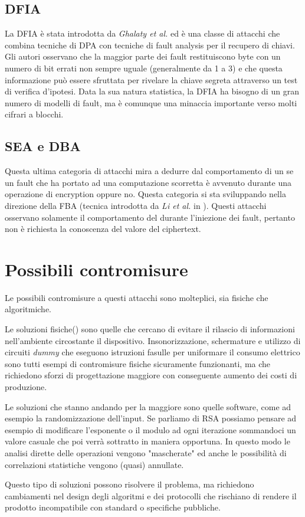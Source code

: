 		\subsection*{\ac{DFIA}}
			La \ac{DFIA} è stata introdotta da \emph{Ghalaty et al.}\cite{ghalaty2014differential} ed è una classe di attacchi che combina tecniche di \ac{DPA} con tecniche di fault analysis per il recupero di chiavi\cite{fuhr2013fault}. Gli autori osservano che la maggior parte dei fault restituiscono byte con un numero di bit errati non sempre uguale (generalmente da 1 a 3) e che questa informazione può essere sfruttata per rivelare la chiave segreta attraverso un test di verifica d'ipotesi. Data la sua natura statistica, la \ac{DFIA} ha bisogno di un gran numero di modelli di fault, ma è comunque una minaccia importante verso molti cifrari a blocchi.
			
		\subsection*{\ac{SEA} e \ac{DBA}}
			Questa ultima categoria di attacchi mira a dedurre dal comportamento di un \disps se un fault che ha portato ad una computazione scorretta è avvenuto durante una operazione di encryption oppure no\cite{robisson2007differential}. Questa categoria si sta sviluppando nella direzione della \ac{FBA} (tecnica introdotta da \emph{Li et al.} in \cite{li2014yet}). Questi attacchi osservano solamente il comportamento del \disps durante l'iniezione dei fault, pertanto non è richiesta la conoscenza del valore del ciphertext.
			
	\section{Possibili contromisure}	
		Le possibili contromisure a questi attacchi sono molteplici, sia fisiche che algoritmiche.
		
		Le soluzioni fisiche(\cite{anderson1996tamper,shamir2000protecting,tuyls2006read,tiri2002dynamic}) sono quelle che cercano di evitare il rilascio di informazioni nell'ambiente circostante il dispositivo. Insonorizzazione, schermature e utilizzo di circuiti \emph{dummy} che eseguono istruzioni fasulle per uniformare il consumo elettrico sono tutti esempi di contromisure fisiche sicuramente funzionanti, ma che richiedono sforzi di progettazione maggiore con conseguente aumento dei costi di produzione.
		
		Le soluzioni che stanno andando per la maggiore sono quelle software, come ad esempio la randomizzazione dell'input\cite{boscher2012randomized}. Se parliamo di RSA possiamo pensare ad esempio di modificare l'esponente o il modulo ad ogni iterazione sommandoci un valore casuale che poi verrà sottratto in maniera opportuna. In questo modo le analisi dirette delle operazioni vengono "mascherate" ed anche le possibilità di correlazioni statistiche vengono (quasi) annullate.
		
		Questo tipo di soluzioni possono risolvere il problema, ma richiedono cambiamenti nel design degli algoritmi e dei protocolli che rischiano di rendere il prodotto incompatibile con standard o specifiche pubbliche.